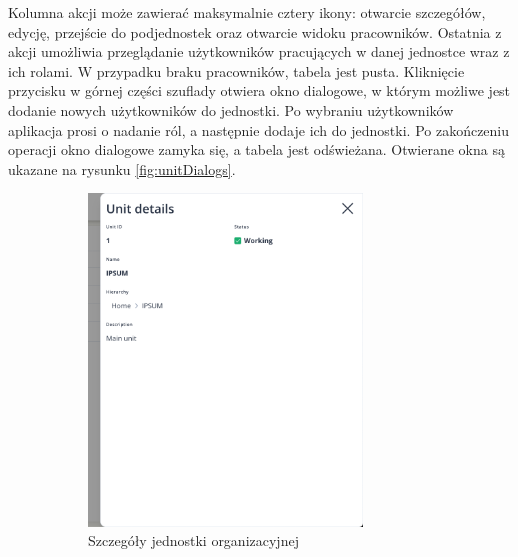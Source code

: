 Kolumna akcji może zawierać maksymalnie cztery ikony: otwarcie szczegółów, edycję, przejście do podjednostek oraz otwarcie widoku pracowników. Ostatnia z akcji umożliwia przeglądanie użytkowników pracujących w danej jednostce wraz z ich rolami. W przypadku braku pracowników, tabela jest pusta. Kliknięcie przycisku w górnej części szuflady otwiera okno dialogowe, w którym możliwe jest dodanie nowych użytkowników do jednostki. Po wybraniu użytkowników aplikacja prosi o nadanie ról, a następnie dodaje ich do jednostki. Po zakończeniu operacji okno dialogowe zamyka się, a tabela jest odświeżana. Otwierane okna są ukazane na rysunku \ref{fig:unitDialogs}.

\begin{figure}[H]
    \centering
    \begin{subfigure}[b]{0.49\textwidth}
        \centering
        \includegraphics[width=0.8\textwidth, frame]{graf/front/unitDetails.png}
        \caption{Szczegóły jednostki organizacyjnej}
    \end{subfigure}
    \begin{subfigure}[b]{0.49\textwidth}
        \centering

\end{subfigure}
\end{figure}

